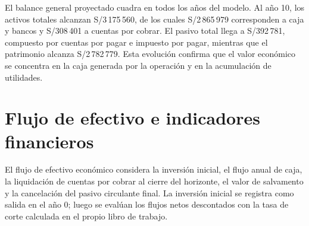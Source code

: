 \begin{table}[H]
	\centering
	\scriptsize
	\mqiTableSetup
	\caption[Presupuesto de caja del proyecto]{Presupuesto de caja del escenario base. Fuente: hoja \texttt{PRESUPUESTO CAJA}.}
	\label{tab:presupuesto-caja-proyecto}
\end{table}

El balance general proyectado cuadra en todos los años del modelo. Al año 10, los activos totales alcanzan S/3\,175\,560, de los cuales S/2\,865\,979 corresponden a caja y bancos y S/308\,401 a cuentas por cobrar. El pasivo total llega a S/392\,781, compuesto por cuentas por pagar e impuesto por pagar, mientras que el patrimonio alcanza S/2\,782\,779. Esta evolución confirma que el valor económico se concentra en la caja generada por la operación y en la acumulación de utilidades.

\section{Flujo de efectivo e indicadores financieros}

El flujo de efectivo económico considera la inversión inicial, el flujo anual de caja, la liquidación de cuentas por cobrar al cierre del horizonte, el valor de salvamento y la cancelación del pasivo circulante final. La inversión inicial se registra como salida en el año 0; luego se evalúan los flujos netos descontados con la tasa de corte calculada en el propio libro de trabajo.

